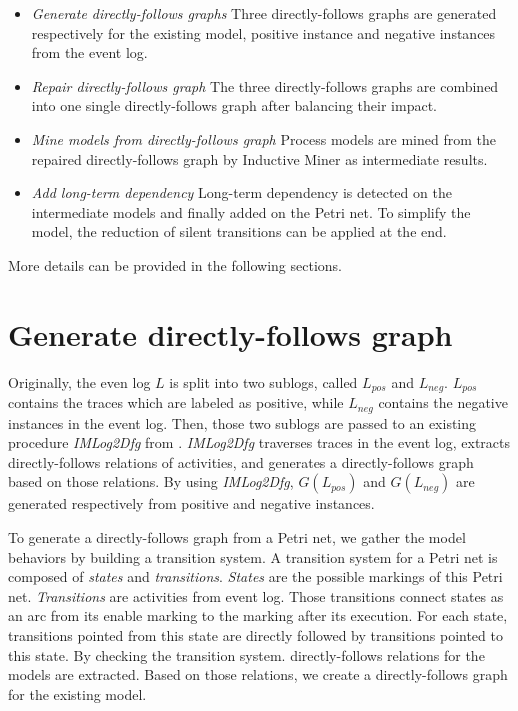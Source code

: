 \begin{itemize}
	\item \emph{Generate directly-follows graphs}\quad 
	Three directly-follows graphs are generated respectively for the existing model, positive instance and negative instances from the event log.
	\item \emph{Repair directly-follows graph} \quad
	The three directly-follows graphs are combined into one single directly-follows graph after balancing their impact.
	\item \emph{Mine models from directly-follows graph} \quad
	Process models are mined from the repaired directly-follows graph by Inductive Miner as intermediate results.
	\item \emph{Add long-term dependency} \quad
	Long-term dependency is detected on the intermediate models and finally added on the Petri net. To simplify the model, the reduction of silent transitions can be applied at the end.
\end{itemize}
More details can be provided in the following sections.

\section{Generate directly-follows graph}
Originally, the even log $L$ is split into two sublogs, called $L_{pos}$ and $L_{neg}$. $L_{pos}$ contains the traces which are labeled as positive, while $L_{neg}$ contains the negative instances in the event log. Then, those two sublogs are passed to an existing procedure \emph{IMLog2Dfg} from \cite{leemans2013discovering}. \emph{IMLog2Dfg} traverses traces in the event log, extracts directly-follows relations of activities, and generates a directly-follows graph based on those relations. By using \emph{IMLog2Dfg}, $G(L_{pos})$ and $G(L_{neg})$ are generated respectively from positive and negative instances.

To generate a directly-follows graph from a Petri net, we gather the model behaviors by building a transition system. A transition system for a Petri net is composed of \emph{states} and \emph{transitions}. \emph{States} are the possible markings of this Petri net. \emph{Transitions} are activities from event log. Those transitions connect states as an arc from its enable marking to the marking after its execution. For each state, transitions pointed from this state are directly followed by transitions pointed to this state. By checking the transition system. directly-follows relations for the models are extracted. Based on those relations, we create a directly-follows graph for the existing model.

